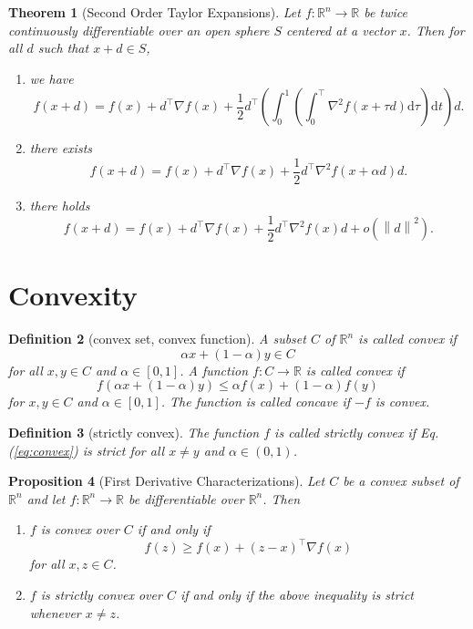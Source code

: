 \documentclass[12pt,a4paper]{article}
\numberwithin{equation}{section}
\theoremstyle{mystyle}
\newtheorem{definition}{Definition}[section]
\newtheorem{theorem}[definition]{Theorem}
\newtheorem{proposition}[definition]{Proposition}
\newcommand{\R}{\mathbb{R}}
\newcommand{\grad}{\nabla}
\renewcommand{\d}{\mathrm{d}}
\newcommand{\T}{\top}
\newcommand{\norm}[1]{\left\lVert #1 \right\rVert}
\begin{document}
	\begin{theorem}[Second Order Taylor Expansions]
		Let $f:\R^n \to \R$ be twice continuously differentiable over an open sphere $S$ centered at a vector $x$. Then for all $d$ such that $x+d\in S$,
		\begin{enumerate}
			\item we have
			$$
			f(x+d)=f(x)+d^\T \grad f(x) +\frac{1}{2}d^\T\left(\int_0^1\left(\int_0^\T \grad^2 f(x+\tau d)\d \tau\right)\d t\right)d.
			$$
			\item there exists
			$$
			f(x+d)=f(x)+d^\T \grad f(x)+\frac{1}{2}d^\T \grad^2 f(x+\alpha d)d.
			$$
			\item there holds
			$$
			f(x+d)=f(x)+d^\T \grad f(x)+\frac{1}{2}d^\T \grad^2 f(x)d+o(\norm{d}^2).
			$$
		\end{enumerate}
	\end{theorem}


	\section{Convexity}
	\begin{definition}[convex set, convex function]
		A subset $C$ of $\R^n$ is called \emph{convex} if 
		$$
		\alpha x+(1-\alpha)y\in C
		$$ for all $x,y\in C$ and $\alpha\in [0,1]$. A function $f:C\to \R$ is called \emph{convex} if 
		\begin{equation}
			f(\alpha x+(1-\alpha )y)\leq 
			\alpha f(x)+(1-\alpha)f(y)\label{eq:convex}
		\end{equation}
		for $x,y\in C$ and $\alpha\in [0,1]$. The function is called \emph{concave} if $-f$ is convex.
	\end{definition}
	\begin{definition}[strictly convex]
		The function $f$ is called \emph{strictly convex} if Eq.(\ref{eq:convex}) is strict for all $x\neq y$ and $\alpha\in(0,1)$.
	\end{definition}

	\begin{proposition}[First Derivative Characterizations]
		Let $C$ be a convex subset of $\R^n$ and let $f:\R^n \to \R$ be differentiable over $\R^n$. Then
		\begin{enumerate}
			\item $f$ is convex over $C$ if and only if
			\begin{equation}
				f(z)\geq f(x)+(z-x)^\T \grad f(x)
			\end{equation}
			for all $x,z\in C$.
			\item $f$ is strictly convex over $C$ if and only if the above inequality is strict whenever $x\neq z$.
		\end{enumerate}
	\end{proposition}
\end{document}
